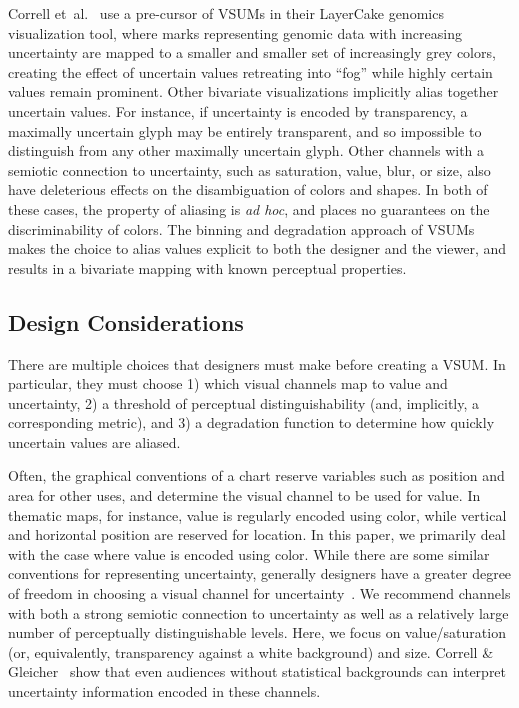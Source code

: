 \documentclass{vgtc}                          %
\newcommand{\ea}{{et~al.}\xspace}
\begin{document}
Correll \ea~\cite{correll2015layercake,correll2011visualizing} use a pre-cursor of VSUMs in their LayerCake genomics visualization tool, where marks representing genomic data with increasing uncertainty are mapped to a smaller and smaller set of increasingly grey colors, creating the effect of uncertain values retreating into ``fog'' while highly certain values remain prominent. Other bivariate visualizations implicitly alias together uncertain values. For instance, if uncertainty is encoded by transparency, a maximally uncertain glyph may be entirely transparent, and so impossible to distinguish from any other maximally uncertain glyph. Other channels with a semiotic connection to uncertainty, such as saturation, value, blur, or size, also have deleterious effects on the disambiguation of colors and shapes. In both of these cases, the property of aliasing is \emph{ad hoc}, and places no guarantees on the discriminability of colors. The binning and degradation approach of VSUMs makes the choice to alias values explicit to both the designer and the viewer, and results in a bivariate mapping with known perceptual properties.

\subsection{Design Considerations}

\performanceFig

There are multiple choices that designers must make before creating a VSUM. In particular, they must choose 1) which visual channels map to value and uncertainty, 2) a threshold of perceptual distinguishability (and, implicitly, a corresponding metric), and 3) a degradation function to determine how quickly uncertain values are aliased.

Often, the graphical conventions of a chart reserve variables such as position and area for other uses, and determine the visual channel to be used for value. In thematic maps, for instance, value is regularly encoded using color, while vertical and horizontal position are reserved for location. In this paper, we primarily deal with the case where value is encoded using color. While there are some similar conventions for representing uncertainty, generally designers have a greater degree of freedom in choosing a visual channel for uncertainty~\cite{maceachren1992visualizing}. We recommend channels with both a strong semiotic connection to uncertainty as well as a relatively large number of perceptually distinguishable levels. Here, we focus on value/saturation (or, equivalently, transparency against a white background) and size. Correll \& Gleicher~\cite{correll2013error} show that even audiences without statistical backgrounds can interpret uncertainty information encoded in these channels.
\end{document}
